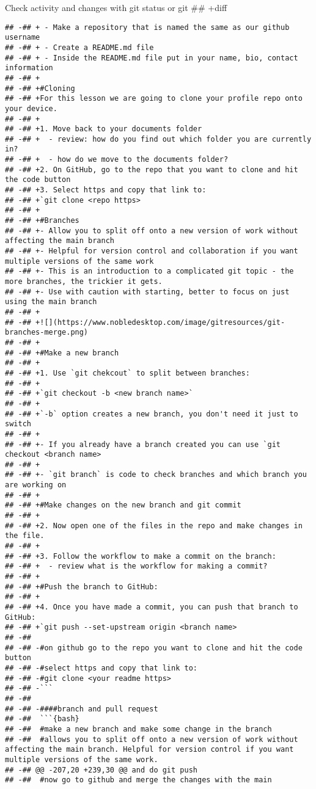 \documentclass[ignorenonframetext,]{beamer}
\begin{document}
\begin{frame}[fragile]{Check activity and changes with git status or git
## +diff}
\begin{verbatim}
## -## + - Make a repository that is named the same as our github username
## -## + - Create a README.md file
## -## + - Inside the README.md file put in your name, bio, contact information
## -## +
## -## +#Cloning
## -## +For this lesson we are going to clone your profile repo onto your device. 
## -## +
## -## +1. Move back to your documents folder 
## -## +  - review: how do you find out which folder you are currently in? 
## -## +  - how do we move to the documents folder? 
## -## +2. On GitHub, go to the repo that you want to clone and hit the code button
## -## +3. Select https and copy that link to: 
## -## +`git clone <repo https>
## -## +
## -## +#Branches
## -## +- Allow you to split off onto a new version of work without affecting the main branch 
## -## +- Helpful for version control and collaboration if you want multiple versions of the same work
## -## +- This is an introduction to a complicated git topic - the more branches, the trickier it gets. 
## -## +- Use with caution with starting, better to focus on just using the main branch
## -## +
## -## +![](https://www.nobledesktop.com/image/gitresources/git-branches-merge.png)
## -## +
## -## +#Make a new branch
## -## +
## -## +1. Use `git chekcout` to split between branches:
## -## +
## -## +`git checkout -b <new branch name>`
## -## +
## -## +`-b` option creates a new branch, you don't need it just to switch
## -## +
## -## +- If you already have a branch created you can use `git checkout <branch name>
## -## +
## -## +- `git branch` is code to check branches and which branch you are working on 
## -## +
## -## +#Make changes on the new branch and git commit
## -## +
## -## +2. Now open one of the files in the repo and make changes in the file. 
## -## +
## -## +3. Follow the workflow to make a commit on the branch: 
## -## +  - review what is the workflow for making a commit? 
## -## +
## -## +#Push the branch to GitHub:
## -## +
## -## +4. Once you have made a commit, you can push that branch to GitHub:
## -## +`git push --set-upstream origin <branch name>
## -##  
## -## -#on github go to the repo you want to clone and hit the code button
## -## -#select https and copy that link to: 
## -## -#git clone <your readme https>
## -## -```
## -##  
## -## -####branch and pull request
## -##  ```{bash}
## -##  #make a new branch and make some change in the branch
## -##  #allows you to split off onto a new version of work without affecting the main branch. Helpful for version control if you want multiple versions of the same work. 
## -## @@ -207,20 +239,30 @@ and do git push
## -##  #now go to github and merge the changes with the main

\end{verbatim}
\end{frame}
\end{document}
